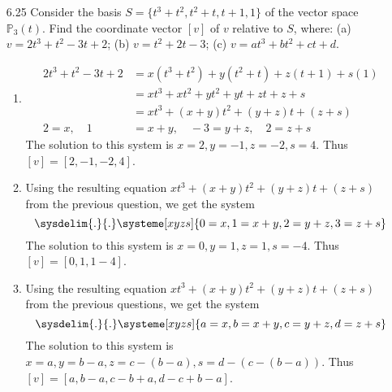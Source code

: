 \documentclass[12pt]{article}
\theoremstyle{definition}
\theoremstyle{plain}
\begin{document}
\begin{enumerate}
\item[6.25] Consider the basis $S=\{t^3+t^2, t^2+t, t+1, 1\}$ of the vector space $\mathbb{P}_3(t)$. Find the coordinate vector $[v]$ of $v$ relative to $S$, where: (a) $v=2t^3+t^2-3t+2$; (b) $v=t^2+2t-3$; (c) $v=at^3+bt^2+ct+d$.
	\begin{enumerate}
	\item
		\begin{align*}
		2t^3+t^2-3t+2 &= x(t^3+t^2)+y(t^2+t)+z(t+1)+s(1)\\
		&= xt^3+xt^2+yt^2+yt+zt+z+s\\
		&= xt^3+(x+y)t^2+(y+z)t+(z+s)\\
		2=x, \quad 1&=x+y, \quad -3=y+z, \quad 2=z+s
		\end{align*}
		The solution to this system is $x=2, y=-1, z=-2, s=4$. Thus $[v]=[2,-1,-2,4]$.
	\item
		Using the resulting equation $xt^3+(x+y)t^2+(y+z)t+(z+s)$ from the previous question, we get the system
		\[ \sysdelim{.}{.}\systeme[xyzs]{0=x,1=x+y,2=y+z, \-3=z+s} \]
		The solution to this system is $x=0, y=1, z=1, s=-4$. Thus $[v]=[0,1,1-4]$.
	\item
		Using the resulting equation $xt^3+(x+y)t^2+(y+z)t+(z+s)$ from the previous questions, we get the system
		\[ \sysdelim{.}{.}\systeme[xyzs]{a=x,b=x+y,c=y+z,d=z+s} \]
		The solution to this system is $x=a,y=b-a,z=c-(b-a),s=d-(c-(b-a))$. Thus $[v]=[a,b-a,c-b+a,d-c+b-a]$.
	\end{enumerate}
	

\end{enumerate}
\end{document}
